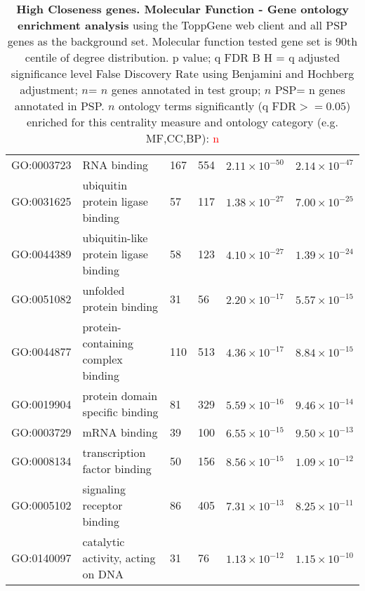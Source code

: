 \begin{table}[ht]
\begin{adjustbox}{width=\textwidth}
\begin{tabular}{@{}clllcl@{}}
  \midrule
GO:0003723 & RNA binding & 167 & 554 & $2.11 \times 10^{-50}$ & $2.14 \times 10^{-47}$ \\ 
  GO:0031625 & ubiquitin protein ligase binding & 57 & 117 & $1.38 \times 10^{-27}$ & $7.00 \times 10^{-25}$ \\ 
  GO:0044389 & ubiquitin-like protein ligase binding & 58 & 123 & $4.10 \times 10^{-27}$ & $1.39 \times 10^{-24}$ \\ 
  GO:0051082 & unfolded protein binding & 31 & 56 & $2.20 \times 10^{-17}$ & $5.57 \times 10^{-15}$ \\ 
  GO:0044877 & protein-containing complex binding & 110 & 513 & $4.36 \times 10^{-17}$ & $8.84 \times 10^{-15}$ \\ 
  GO:0019904 & protein domain specific binding & 81 & 329 & $5.59 \times 10^{-16}$ & $9.46 \times 10^{-14}$ \\ 
  GO:0003729 & mRNA binding & 39 & 100 & $6.55 \times 10^{-15}$ & $9.50 \times 10^{-13}$ \\ 
  GO:0008134 & transcription factor binding & 50 & 156 & $8.56 \times 10^{-15}$ & $1.09 \times 10^{-12}$ \\ 
  GO:0005102 & signaling receptor binding & 86 & 405 & $7.31 \times 10^{-13}$ & $8.25 \times 10^{-11}$ \\ 
  GO:0140097 & catalytic activity, acting on DNA & 31 & 76 & $1.13 \times 10^{-12}$ & $1.15 \times 10^{-10}$ \\ 
   \bottomrule
\end{tabular}
\end{adjustbox}
\caption[Gene ontology enrichment High Closeness genes Molecular Function of genes above 90th centile of distribution]{\textbf{High Closeness genes. Molecular Function - Gene ontology enrichment analysis} using the ToppGene web client and all PSP genes as the background set.  Molecular function tested gene set is 90th centile of degree distribution.  p value; q FDR B H = q adjusted significance level False Discovery Rate using Benjamini and Hochberg adjustment; $n$= $n$ genes annotated in test group; $n$ PSP= n genes annotated in PSP. $n$ ontology terms significantly (q FDR$>=0.05$) enriched for this centrality measure and ontology category (e.g. MF,CC,BP): \textcolor{red}{n}} 
\label{tab:ToppGENE GO: Molecular Function. clo 90 centile cwpsp.txtp = p value; q FDR B H = q adjusted significance level False Discovery Rate using Benjamini and Hochberg adjustment; n= n genes annotated in test group; n PSP= n genes annotated in PSP}
\end{table}

